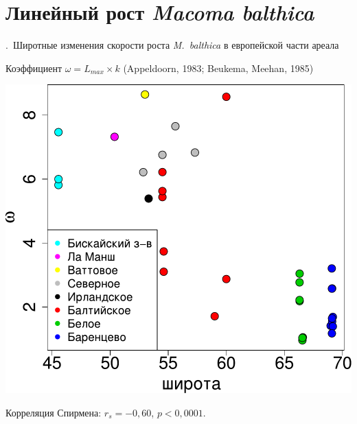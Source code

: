\documentclass[aspectratio=169, xcolor=table]{beamer}
\begin{document}
		\section[Линейный рост]{Линейный рост {\it Macoma balthica}}

\begin{frame}{\insertpagenumber.\ Широтные изменения скорости роста {\it M.~balthica} в европейской части ареала}

{\footnotesize Коэффициент $\omega = L_{max} \times k$ (Appeldoorn, 1983; Beukema, Meehan, 1985)}
		\begin{center}
			\includegraphics[height=.68\textheight]{./long_vs_omega_big1.pdf}
		\end{center}
{\footnotesize Корреляция Спирмена: $r_{s} = -0,60$, $p < 0,0001$.}

\end{frame}
\end{document}
